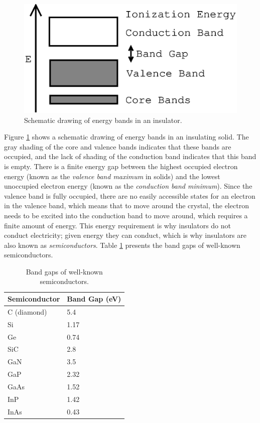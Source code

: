 \begin{figure}
\begin{center}
\includegraphics[scale=0.5]{E_Bands.eps}
\caption{Schematic drawing of energy bands in an insulator.}
\label{e-bands-fig}
\end{center}
\end{figure}

Figure \ref{e-bands-fig} shows a schematic drawing of energy bands in
an insulating solid. The gray shading of the core and valence bands
indicates that these bands are occupied, and the lack of shading of the
conduction band indicates that this band is empty. There is a finite
energy gap between the highest occupied electron energy (known as the
\emph{valence band maximum} in solids) and the lowest unoccupied
electron energy (known as the \emph{conduction band minimum}). Since
the valence band is fully occupied, there are no easily accessible
states for an electron in the valence band, which means that to move
around the crystal, the electron needs to be excited into the
conduction band to move around, which requires a finite amount of
energy. This energy requirement is why insulators do not conduct
electricity; given energy they can conduct, which is why insulators
are also known as \emph{semiconductors}. Table \ref{band-gaps-table}
presents the band gaps of well-known semiconductors.

\begin{table}
\begin{center}
\caption{Band gaps of well-known semiconductors.}
\label{band-gaps-table}
\begin{tabular}{ll}\\ \hline\hline
Semiconductor & Band Gap (eV) \\ \hline
C (diamond) & 5.4 \\
Si & 1.17 \\
Ge & 0.74 \\
SiC & 2.8 \\
GaN & 3.5 \\
GaP & 2.32 \\
GaAs & 1.52 \\
InP & 1.42 \\
InAs & 0.43 \\
\hline\hline
\end{tabular}
\end{center}
\end{table}

